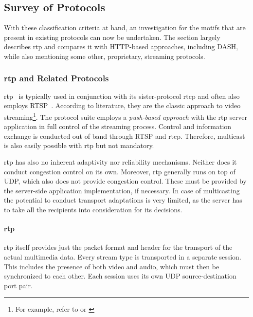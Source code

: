 \subsection{Survey of Protocols}

With these classification criteria at hand, an investigation for the motifs that are present in existing protocols can now be undertaken. The section largely describes \gls{rtp} and compares it with \gls{HTTP}-based approaches, including \gls{DASH}, while also mentioning some other, proprietary, streaming protocols.


\subsubsection{\texorpdfstring{\acrshort{rtp}}{rtp} and Related Protocols}

\gls{rtp}~\cite{rfc3550} is typically used in conjunction with its sister-protocol \gls{rtcp} and often also employs \gls{RTSP}~\cite{rfc2326}. According to literature, they are the classic approach to video streaming\footnote{For example, refer to \cite[p.~589ff]{kurose2008computer} or \cite[p.~426ff]{peterson2007computer}}.
The protocol suite employs a \textit{push-based approach} with the \gls{rtp} server application in full control of the streaming process. Control and information exchange is conducted out of band through \gls{RTSP} and \gls{rtcp}. Therefore, multicast is also easily possible with \gls{rtp} but not mandatory.

\gls{rtp} has also no inherent adaptivity nor reliability mechanisms. Neither does it conduct congestion control on its own. Moreover, \gls{rtp} generally runs on top of \gls{UDP}, which also does not provide congestion control. These must be provided by the server-side application implementation, if necessary. In case of multicasting the potential to conduct transport adaptations is very limited, as the server has to take all the recipients into consideration for its decisions.


\paragraph{\gls{rtp}}

\gls{rtp} itself provides just the packet format and header for the transport of the actual multimedia data. Every stream type is transported in a separate session. This includes the presence of both video and audio, which must then be synchronized to each other. Each session uses its own \gls{UDP} source-destination port pair.

